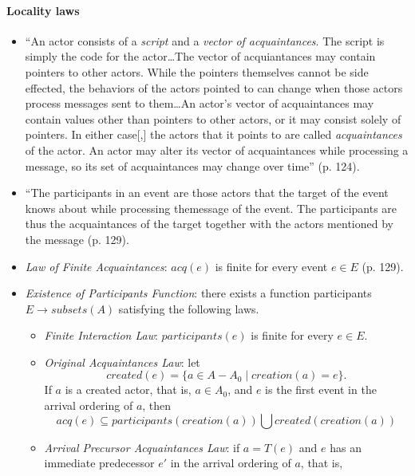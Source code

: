 \paragraph{Locality laws}
\begin{itemize}
\item ``An actor consists of a \emph{script} and a \emph{vector of acquaintances}. The script is simply the code for the actor{\ldots}The vector of acquiantances may contain pointers to other actors. While the pointers themselves cannot be side effected, the behaviors of the actors pointed to can change when those actors process messages sent to them{\ldots}An actor's vector of acquaintances may contain values other than pointers to other actors, or it may consist solely of pointers. In either case[,] the actors that it points to are called \emph{acquaintances} of the actor. An actor may alter its vector of acquaintances while processing a message, so its set of acquaintances may change over time'' (p. 124).
\item ``The participants in an event are those actors that the target of the event knows about while processing themessage of the event. The participants are thus the acquaintances of the target together with the actors mentioned by the message \cite{Hewitt1977b} (p. 129).
\item \emph{Law of Finite Acquaintances}: $\mathit{acq}(e)$ is finite for every event $e \in E$ (p. 129).
\item \emph{Existence of Participants Function}: there exists a function participants $E \rightarrow \mathit{subsets}(A)$ satisfying the following laws.
	\begin{itemize}
	\item \emph{Finite Interaction Law}: $\mathit{participants}(e)$ is finite for every $e \in E$.
	\item \emph{Original Acquaintances Law}: let
		\begin{equation*}
			\mathit{created}(e) = \{a \in A - A_0 \mid \mathit{creation(a) = e}\}.
		\end{equation*}
	If $a$ is a created actor, that is, $a \in A_0$, and $e$ is the first event in the arrival ordering of $a$, then
		\begin{equation*}
			\mathit{acq}(e) \subseteq \mathit{participants(\mathit{creation(a)}) \bigcup \mathit{created}(\mathit{creation}(a))}
		\end{equation*}
	\item \emph{Arrival Precursor Acquaintances Law}: if $a = T(e)$ and $e$ has an immediate predecessor $e'$ in the arrival ordering of $a$, that is,

\end{itemize}
\end{itemize}
